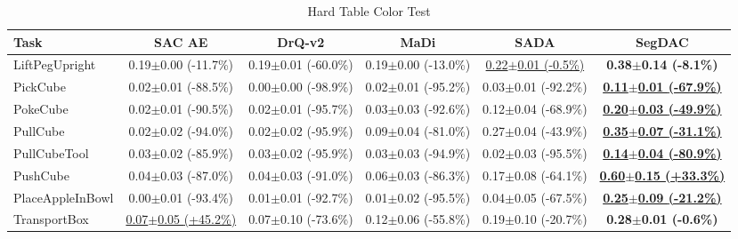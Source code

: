 \begin{table}[htbp]
\centering
\scriptsize
\caption{Hard Table Color Test}
\label{tab:appendix_tablecolortest_hard}
\begin{adjustbox}{max width=\textwidth}
\begin{tabular}{l*{5}{c}}
\toprule
\textbf{Task} & \textbf{SAC AE} & \textbf{DrQ-v2} & \textbf{MaDi} & \textbf{SADA} & \textbf{SegDAC} \\
\midrule
LiftPegUpright & 0.19$\pm$0.00 \scriptsize{(-11.7\%)} & 0.19$\pm$0.01 \scriptsize{(-60.0\%)} & 0.19$\pm$0.00 \scriptsize{(-13.0\%)} & \underline{0.22$\pm$0.01 \scriptsize{(-0.5\%)}} & \textbf{0.38$\pm$0.14 \scriptsize{(-8.1\%)}} \\
PickCube & 0.02$\pm$0.01 \scriptsize{(-88.5\%)} & 0.00$\pm$0.00 \scriptsize{(-98.9\%)} & 0.02$\pm$0.01 \scriptsize{(-95.2\%)} & 0.03$\pm$0.01 \scriptsize{(-92.2\%)} & \textbf{\underline{0.11$\pm$0.01 \scriptsize{(-67.9\%)}}} \\
PokeCube & 0.02$\pm$0.01 \scriptsize{(-90.5\%)} & 0.02$\pm$0.01 \scriptsize{(-95.7\%)} & 0.03$\pm$0.03 \scriptsize{(-92.6\%)} & 0.12$\pm$0.04 \scriptsize{(-68.9\%)} & \textbf{\underline{0.20$\pm$0.03 \scriptsize{(-49.9\%)}}} \\
PullCube & 0.02$\pm$0.02 \scriptsize{(-94.0\%)} & 0.02$\pm$0.02 \scriptsize{(-95.9\%)} & 0.09$\pm$0.04 \scriptsize{(-81.0\%)} & 0.27$\pm$0.04 \scriptsize{(-43.9\%)} & \textbf{\underline{0.35$\pm$0.07 \scriptsize{(-31.1\%)}}} \\
PullCubeTool & 0.03$\pm$0.02 \scriptsize{(-85.9\%)} & 0.03$\pm$0.02 \scriptsize{(-95.9\%)} & 0.03$\pm$0.03 \scriptsize{(-94.9\%)} & 0.02$\pm$0.03 \scriptsize{(-95.5\%)} & \textbf{\underline{0.14$\pm$0.04 \scriptsize{(-80.9\%)}}} \\
PushCube & 0.04$\pm$0.03 \scriptsize{(-87.0\%)} & 0.04$\pm$0.03 \scriptsize{(-91.0\%)} & 0.06$\pm$0.03 \scriptsize{(-86.3\%)} & 0.17$\pm$0.08 \scriptsize{(-64.1\%)} & \textbf{\underline{0.60$\pm$0.15 \scriptsize{(+33.3\%)}}} \\
PlaceAppleInBowl & 0.00$\pm$0.01 \scriptsize{(-93.4\%)} & 0.01$\pm$0.01 \scriptsize{(-92.7\%)} & 0.01$\pm$0.02 \scriptsize{(-95.5\%)} & 0.04$\pm$0.05 \scriptsize{(-67.5\%)} & \textbf{\underline{0.25$\pm$0.09 \scriptsize{(-21.2\%)}}} \\
TransportBox & \underline{0.07$\pm$0.05 \scriptsize{(+45.2\%)}} & 0.07$\pm$0.10 \scriptsize{(-73.6\%)} & 0.12$\pm$0.06 \scriptsize{(-55.8\%)} & 0.19$\pm$0.10 \scriptsize{(-20.7\%)} & \textbf{0.28$\pm$0.01 \scriptsize{(-0.6\%)}} \\
\bottomrule
\end{tabular}
\end{adjustbox}
\end{table}

